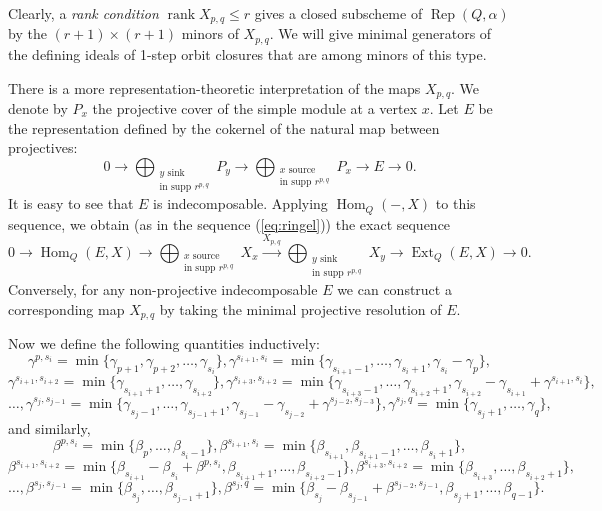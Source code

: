 \documentclass[twoside]{article}
\newcommand{\Hom}{\operatorname{Hom}}
\newcommand{\Ext}{\operatorname{Ext}}
\newcommand{\Rep}{\operatorname{Rep}}
\newcommand{\rank}{\operatorname{rank}}
\theoremstyle{definition}
\begin{document}
Clearly, a \textit{rank condition} $\rank X_{p,q} \leq r$ gives a closed subscheme of $\Rep(Q,\alpha)$ by the $(r+1)\times (r+1)$ minors of $X_{p,q}$. We will give minimal generators of the defining ideals of 1-step orbit closures that are among minors of this type.

There is a more representation-theoretic interpretation of the maps $X_{p,q}$. We denote by $P_x$ the projective cover of the simple module at a vertex $x$. Let $E$ be the representation defined by the cokernel of the natural map between projectives:
\begin{equation}\label{eq:proj}
0 \to \bigoplus_{\substack{y \text{ sink}\\ \text{in supp } r^{p,q}}} P_y \to  \bigoplus_{\substack{x \text{ source}\\ \text{in supp } r^{p,q}}} P_x \to E\to 0.
\end{equation}
It is easy to see that $E$ is indecomposable. Applying $\Hom_Q(-,X)$ to this sequence, we obtain  (as in the sequence (\ref{eq:ringel})) the exact sequence
\begin{equation}\label{eq:hom}
0\to \Hom_Q(E,X)\to \bigoplus_{\substack{x \text{ source}\\ \text{in supp } r^{p,q}}} X_x \xrightarrow{X_{p,q}} \bigoplus_{\substack{y \text{ sink}\\ \text{in supp } r^{p,q}}} X_y \to \Ext_Q(E,X) \to 0.
\end{equation}
Conversely, for any non-projective indecomposable $E$ we can construct a corresponding map $X_{p,q}$ by taking the minimal projective resolution of $E$.

\vspace{0.2in}

Now we define the following quantities inductively:
$$\gamma^{p,s_i}=\min\{\gamma_{p+1},\gamma_{p+2},\dots,\gamma_{s_i}\},\gamma^{s_{i+1},s_i}=\min\{\gamma_{s_{i+1}-1},\dots,\gamma_{s_{i}+1},\gamma_{s_i}-\gamma_p\},$$
\[\gamma^{s_{i+1},s_{i+2}}=\!\min\{\gamma_{s_{i+1}+1},\dots,\gamma_{s_{i+2}}\},\gamma^{s_{i+3},s_{i+2}}=\!\min\{\gamma_{s_{i+3}-1},\dots,\gamma_{s_{i+2}+1},\gamma_{s_{i+2}}-\gamma_{s_{i+1}}+\gamma^{s_{i+1},s_i}\},\]
$$\dots,\gamma^{s_j,s_{j-1}}=\min\{\gamma_{s_j-1},\dots,\gamma_{s_{j-1}+1},\gamma_{s_{j-1}}-\gamma_{s_{j-2}}+\gamma^{s_{j-2},s_{j-3}}\},\gamma^{s_j,q}=\min\{\gamma_{s_j+1},\dots,\gamma_{q}\},$$
and similarly,
\[\beta^{p,s_i}=\min\{\beta_p,\dots, \beta_{{s_i}-1}\}, \beta^{s_{i+1},s_i} =  \min\{\beta_{s_{i+1}},\beta_{s_{i+1}-1},\dots,\beta_{s_i+1}\},\]
\[\beta^{s_{i+1},s_{i+2}} = \min\{\beta_{s_{i+1}}-\beta_{s_{i}}+\beta^{p,s_i},\beta_{s_{i+1}+1},\dots,\beta_{s_{i+2}-1}\}, \beta^{s_{i+3},s_{i+2}} = \min\{\beta_{s_{i+3}},\dots, \beta_{s_{i+2}+1}\},\]
\[\dots,\beta^{s_j,s_{j-1}} = \min\{\beta_{s_{j}},\dots,\beta_{s_{j-1}+1} \},\beta^{s_j,q}=\min\{\beta_{s_{j}}-\beta_{s_{j-1}}+\beta^{s_{j-2},s_{j-1}},\beta_{s_{j}+1},\dots,\beta_{q-1}\}.\]
\end{document}
